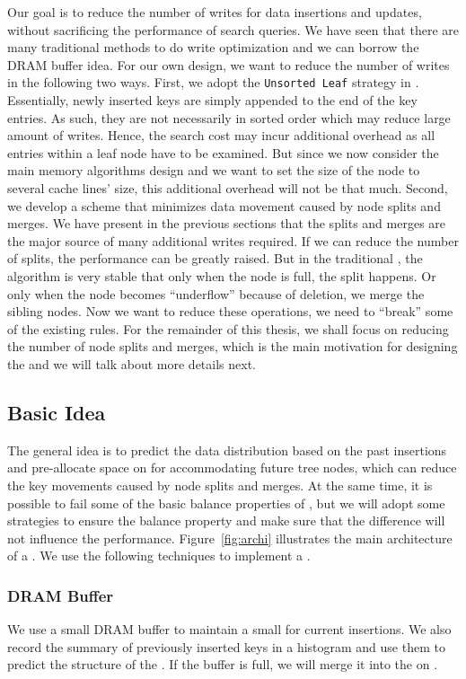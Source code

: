 Our goal is to reduce
the number of writes for data insertions and updates,
without sacrificing the performance of search queries.
We have seen that there are many traditional methods to do write optimization and 
we can borrow the DRAM buffer idea. 
For our own design, we want to reduce the number of writes in the following
 two ways. First, we adopt the
{\tt Unsorted Leaf} strategy in \cite{chen2011rethinking}.
Essentially, newly inserted keys are simply
appended to the end of the key entries. As such, they
are not necessarily in sorted order which may reduce large amount of writes. Hence, the search
cost may incur additional overhead as all entries within
a leaf node have to be examined. But since we now consider the main memory
algorithms design and we want to set the size of the node to several cache lines' size, 
this additional overhead will not be that much. 
Second, we develop a scheme that
minimizes data movement caused by node splits and merges.
We have present in the previous sections that the splits and merges are the 
major source of many additional writes required. If we can reduce 
the number of splits, the performance can be greatly raised. 
But in the traditional \bplustree, the algorithm is very stable that
only when the node is full, the split happens. Or only when the node
becomes ``underflow'' because of deletion, we merge the sibling nodes. 
Now we want to reduce these operations, we need to ``break'' some of the existing rules. 
For the remainder of this thesis, we shall focus on reducing
the number of node splits and merges,
which is the main motivation for designing the \bptree and we will talk about 
more details next. 


\subsection{Basic Idea} 
The general idea
is to predict the data distribution
based on the past insertions and pre-allocate
space on \pcm for accommodating future tree nodes,
which can reduce the key movements caused
by node splits and merges. At the same time, it is possible to 
fail some of the basic balance properties of \bplustree, 
but we will adopt some strategies to ensure the balance property and 
make sure that the difference will not influence the performance. 
Figure~\ref{fig:archi} illustrates the main
architecture of a \bptree.
We use the following techniques to
implement a \bptree.

\subsubsection{DRAM Buffer}
We use a small DRAM buffer to maintain a
  small \bplustree for current insertions.
  We also record the summary of previously
  inserted keys in a histogram and use them to predict
  the structure of the \bptree.
  If the buffer is full,
  we will merge it into the \bptree on \pcm.

